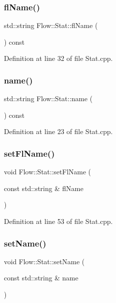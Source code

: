\subsubsection{\texorpdfstring{fl\+Name()}{flName()}}
{\footnotesize\ttfamily std\+::string Flow\+::\+Stat\+::fl\+Name (\begin{DoxyParamCaption}{ }\end{DoxyParamCaption}) const}



Definition at line 32 of file Stat.\+cpp.

\hypertarget{class_flow_1_1_stat_a3b09172b24c2ea0b6a040861b13ac16a}{}\label{class_flow_1_1_stat_a3b09172b24c2ea0b6a040861b13ac16a} 
\subsubsection{\texorpdfstring{name()}{name()}}
{\footnotesize\ttfamily std\+::string Flow\+::\+Stat\+::name (\begin{DoxyParamCaption}{ }\end{DoxyParamCaption}) const}



Definition at line 23 of file Stat.\+cpp.

\hypertarget{class_flow_1_1_stat_aecffa9e7e448ed7880a8f410cd3d96e7}{}\label{class_flow_1_1_stat_aecffa9e7e448ed7880a8f410cd3d96e7} 
\subsubsection{\texorpdfstring{set\+Fl\+Name()}{setFlName()}}
{\footnotesize\ttfamily void Flow\+::\+Stat\+::set\+Fl\+Name (\begin{DoxyParamCaption}\item[{const std\+::string \&}]{fl\+Name }\end{DoxyParamCaption})}



Definition at line 53 of file Stat.\+cpp.

\hypertarget{class_flow_1_1_stat_ab9d4b29ae4826165fea59f87b839c33e}{}\label{class_flow_1_1_stat_ab9d4b29ae4826165fea59f87b839c33e} 
\subsubsection{\texorpdfstring{set\+Name()}{setName()}}
{\footnotesize\ttfamily void Flow\+::\+Stat\+::set\+Name (\begin{DoxyParamCaption}\item[{const std\+::string \&}]{name }\end{DoxyParamCaption})}



